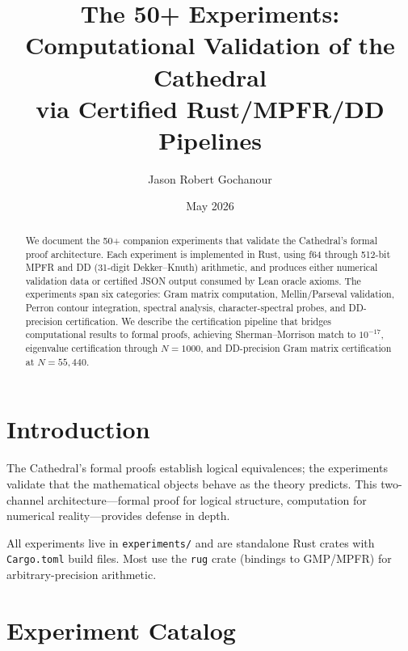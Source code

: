 \documentclass[11pt,a4paper]{article}
\title{%
  The 50+ Experiments:\\
  Computational Validation of the Cathedral\\
  via Certified Rust/MPFR/DD Pipelines%
}
\author{Jason Robert Gochanour}
\date{May 2026}
\begin{document}
\maketitle

\begin{abstract}
We document the 50+ companion experiments that validate the Cathedral's
formal proof architecture. Each experiment is implemented in Rust,
using f64 through 512-bit MPFR and DD (31-digit Dekker--Knuth)
arithmetic, and produces either
numerical validation data or certified JSON output consumed by Lean
oracle axioms. The experiments span six categories: Gram matrix
computation, Mellin/Parseval validation, Perron contour integration,
spectral analysis, character-spectral probes, and DD-precision
certification. We describe the
certification pipeline that bridges computational results to formal
proofs, achieving Sherman--Morrison match to $10^{-17}$,
eigenvalue certification through $N = 1000$, and DD-precision
Gram matrix certification at $N = 55{,}440$.
\end{abstract}

\tableofcontents

\section{Introduction}

The Cathedral's formal proofs establish logical equivalences; the
experiments validate that the mathematical objects behave as the
theory predicts. This two-channel architecture---formal proof for
logical structure, computation for numerical reality---provides
defense in depth.

All experiments live in \texttt{experiments/} and are standalone
Rust crates with \texttt{Cargo.toml} build files. Most use the
\texttt{rug} crate (bindings to GMP/MPFR) for arbitrary-precision
arithmetic.

\section{Experiment Catalog}
\end{document}
